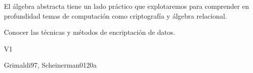 \begin{syllabus}


\begin{justification}
El álgebra abstracta tiene un lado práctico que explotaremos para
comprender en profundidad temas de computación como criptografía y
álgebra relacional.
\end{justification}

\begin{goals}
\item Conocer las técnicas y métodos de encriptación de datos.
\end{goals}

\begin{outcomes}{V1}
   \item {}
   \item {}
   \item {}
\end{outcomes}

\begin{unit}{\IASCryptography}{}{Grimaldi97, Scheinerman01}{20}{a}
    \IASCryptographyAllTopics
    \IASCryptographyAllLearningOutcomes
    
\end{unit}




\end{syllabus}
